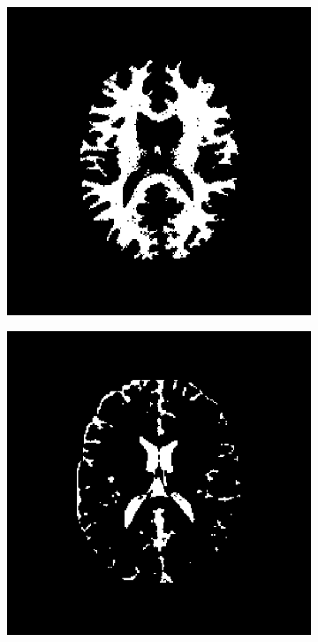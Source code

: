 \begin{figure}[H]
	\centering
	\begin{subfigure}[b]{0.25\linewidth}
		\includegraphics[width=\linewidth]{figures/Module_09/m09_8}
	\end{subfigure}
		\begin{subfigure}[b]{0.25\linewidth}
		\includegraphics[width=\linewidth]{figures/Module_09/m09_9}

\end{subfigure}
\end{figure}
